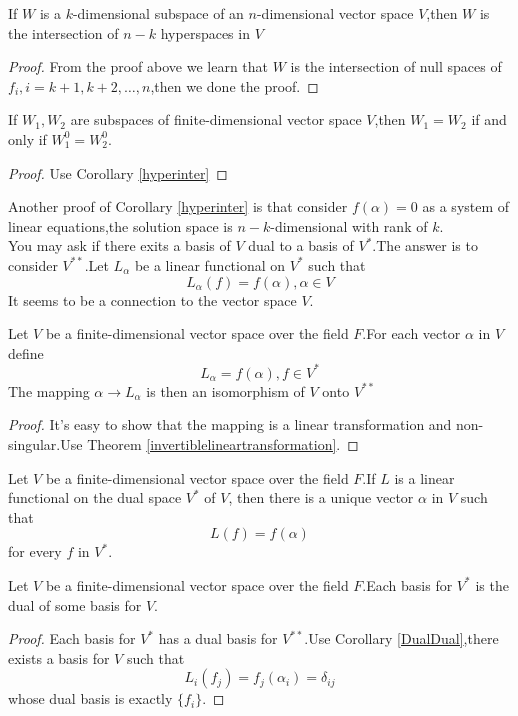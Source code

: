 \documentclass{article}
\begin{document}
\begin{coro}\label{hyperinter}
	If $W$ is a $k$-dimensional subspace of an $n$-dimensional vector space $V$,then $W$ is the intersection of $n-k$ hyperspaces in $V$ 
\end{coro}
\begin{proof}
	From the proof above we learn that $W$ is the intersection of null spaces of $f_i,i=k+1,k+2,\dots,n$,then we done the proof.  
\end{proof}
\begin{coro}\label{uniqueW}
	If $W_1,W_2$ are subspaces of finite-dimensional vector space $V$,then $W_1=W_2$ if and only if $W_1^0=W_2^0$.
\end{coro} 
\begin{proof}
	Use Corollary \ref{hyperinter}
\end{proof}
Another proof of Corollary \ref{hyperinter} is that consider $f(\alpha)=0$ as a system of linear equations,the solution space is $n-k$-dimensional with rank of $k$.\\
You may ask if there exits a basis of $V$ dual to a basis of $V^*$.The answer is to consider $V^{**}$.Let $L_\alpha$ be a linear functional on $V^*$ such that
\[L_\alpha(f)=f(\alpha),\alpha\in V\]
It seems to be a connection to the vector space $V$.
\begin{thm}
	Let $V$ be a finite-dimensional vector space over the field $F$.For each vector $\alpha$ in $V$ define
	\[L_\alpha=f(\alpha),f\in V^*\]
	The mapping $\alpha\rightarrow L_\alpha$ is then an isomorphism of $V$ onto $V^{**}$
\end{thm}
\begin{proof}
	It's easy to show that the mapping is a linear transformation and non-singular.Use Theorem \ref{invertiblelineartransformation}.
\end{proof}
\begin{coro}\label{DualDual}
	Let $V$ be a finite-dimensional vector space over the field $F$.If $L$ is a linear functional on the dual space $V^*$ of $V$, then there is a unique vector $\alpha$ in $V$ such that 
	\[L(f)=f(\alpha)\]
	for every $f$ in $V^*$.
\end{coro}
\begin{coro}
	Let $V$ be a finite-dimensional vector space over the field $F$.Each basis for $V^*$ is the dual of some basis for $V$. 
\end{coro}
\begin{proof}
	Each basis for $V^*$ has a dual basis for $V^{**}$.Use Corollary \ref{DualDual},there exists a basis for $V$ such that
	\[L_i(f_j)=f_j(\alpha_i)=\delta_{ij}\]
	whose dual basis is exactly $\{f_i\}$.
\end{proof}
\end{document}
